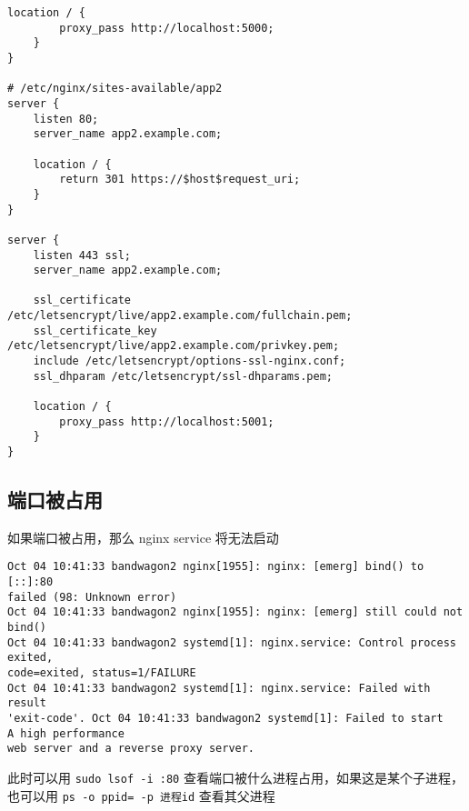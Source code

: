 \begin{itemize}
\begin{lstlisting}[language=none]
    location / {
        proxy_pass http://localhost:5000;
    }
}

# /etc/nginx/sites-available/app2
server {
    listen 80;
    server_name app2.example.com;

    location / {
        return 301 https://$host$request_uri;
    }
}

server {
    listen 443 ssl;
    server_name app2.example.com;

    ssl_certificate /etc/letsencrypt/live/app2.example.com/fullchain.pem;
    ssl_certificate_key /etc/letsencrypt/live/app2.example.com/privkey.pem;
    include /etc/letsencrypt/options-ssl-nginx.conf;
    ssl_dhparam /etc/letsencrypt/ssl-dhparams.pem;

    location / {
        proxy_pass http://localhost:5001;
    }
}
\end{lstlisting}
\end{itemize}

\subsection{端口被占用}
如果端口被占用，那么 nginx service 将无法启动
\begin{lstlisting}[language=none]
Oct 04 10:41:33 bandwagon2 nginx[1955]: nginx: [emerg] bind() to [::]:80
failed (98: Unknown error)
Oct 04 10:41:33 bandwagon2 nginx[1955]: nginx: [emerg] still could not bind()
Oct 04 10:41:33 bandwagon2 systemd[1]: nginx.service: Control process exited,
code=exited, status=1/FAILURE
Oct 04 10:41:33 bandwagon2 systemd[1]: nginx.service: Failed with result
'exit-code'. Oct 04 10:41:33 bandwagon2 systemd[1]: Failed to start
A high performance
web server and a reverse proxy server.
\end{lstlisting}
此时可以用 \verb`sudo lsof -i :80` 查看端口被什么进程占用，如果这是某个子进程，也可以用 \verb`ps -o ppid= -p 进程id` 查看其父进程
